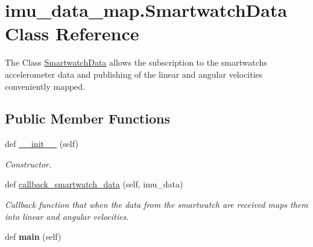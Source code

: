 \hypertarget{classimu__data__map_1_1SmartwatchData}{}\section{imu\+\_\+data\+\_\+map.\+Smartwatch\+Data Class Reference}
\label{classimu__data__map_1_1SmartwatchData}


The Class \mbox{\hyperlink{classimu__data__map_1_1SmartwatchData}{Smartwatch\+Data}} allows the subscription to the smartwatch\textquotesingle{}s accelerometer data and publishing of the linear and angular velocities conveniently mapped.  


\subsection*{Public Member Functions}
\begin{DoxyCompactItemize}
\item 
\mbox{\label{classimu__data__map_1_1SmartwatchData_a70241d60826f54585354c2d03ae0f715}} 
def \mbox{\hyperlink{classimu__data__map_1_1SmartwatchData_a70241d60826f54585354c2d03ae0f715}{\+\_\+\+\_\+init\+\_\+\+\_\+}} (self)
\begin{DoxyCompactList}\small\item\em Constructor. \end{DoxyCompactList}\item 
def \mbox{\hyperlink{classimu__data__map_1_1SmartwatchData_ad7bedaa8d67da50b9db0b9d0984816d0}{callback\+\_\+smartwatch\+\_\+data}} (self, imu\+\_\+data)
\begin{DoxyCompactList}\small\item\em Callback function that when the data from the smartwatch are received maps them into linear and angular velocities. \end{DoxyCompactList}\item 
\mbox{\label{classimu__data__map_1_1SmartwatchData_a6b1c969a38da1dda745ef4461fafe99e}} 
def {\bfseries main} (self)
\end{DoxyCompactItemize}
